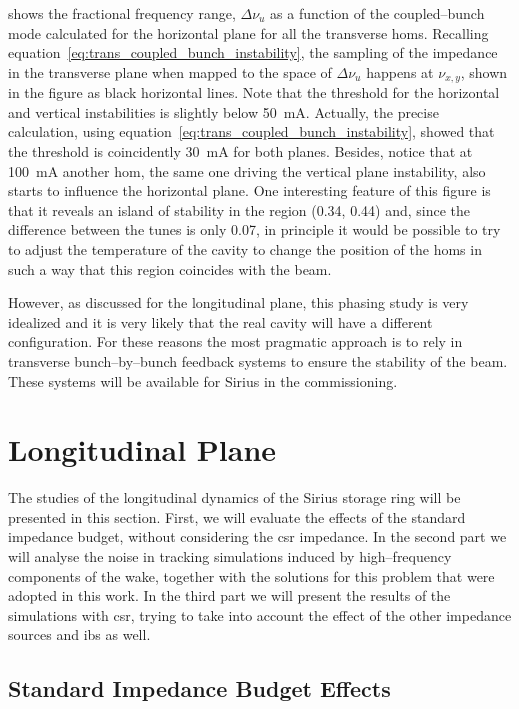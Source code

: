     shows the fractional frequency range, $\Delta\nu_u$ as a function of the coupled--bunch mode calculated for the horizontal plane for all the transverse \glspl{hom}. Recalling equation~\eqref{eq:trans_coupled_bunch_instability}, the sampling of the impedance in the transverse plane when mapped to the space of $\Delta\nu_u$ happens at $\nu_{x,y}$, shown in the figure as black horizontal lines. Note that the threshold for the horizontal and vertical instabilities is slightly below \SI{50}{\milli\ampere}.
    Actually, the precise calculation, using equation~\eqref{eq:trans_coupled_bunch_instability}, showed that the threshold is coincidently \SI{30}{\milli\ampere} for both planes. Besides, notice that at \SI{100}{\milli\ampere} another \gls{hom}, the same one driving the vertical plane instability, also starts to influence the horizontal plane. One interesting feature of this figure is that it reveals an island of stability in the region (0.34, 0.44) and, since the difference between the tunes is only \num{0.07}, in principle it would be possible to try to adjust the temperature of the cavity to change the position of the \glspl{hom} in such a way that this region coincides with the beam.

    However, as discussed for the longitudinal plane, this phasing study is very idealized and it is very likely that the real cavity will have a different configuration. For these reasons the most pragmatic approach is to rely in transverse bunch--by--bunch feedback systems to ensure the stability of the beam. These systems will be available for Sirius in the commissioning.

\section{Longitudinal Plane}\label{sec:longitudinal_plane}

    The studies of the longitudinal dynamics of the Sirius storage ring will be presented in this section. First, we will evaluate the effects of the standard impedance budget, without considering the \gls{csr} impedance. In the second part we will analyse the noise in tracking simulations induced by high--frequency components of the wake, together with the solutions for this problem that were adopted in this work. In the third part we will present the results of the simulations with \gls{csr}, trying to take into account the effect of the other impedance sources and \gls{ibs} as well.

\subsection{Standard Impedance Budget Effects}\label{ssec:imp_bud_effects}

